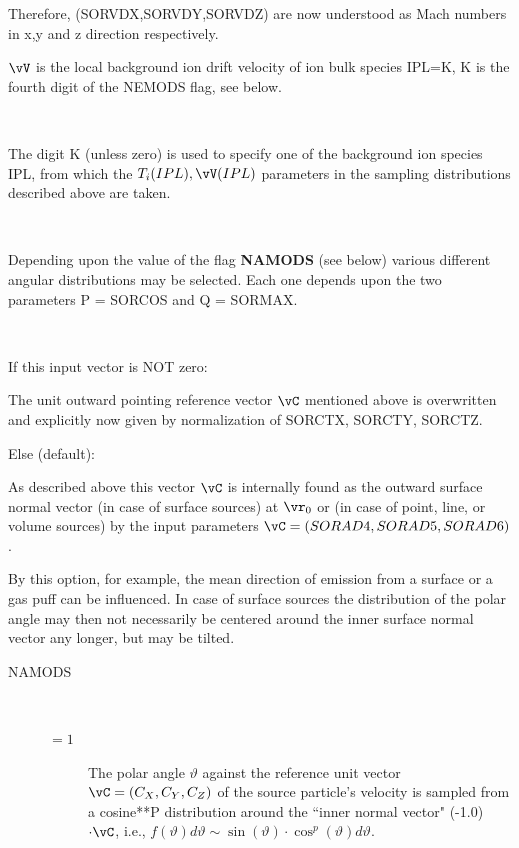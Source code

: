 \begin{description}
\begin{description}
                Therefore, {(SORVDX,SORVDY,SORVDZ)} are now understood as Mach numbers in x,y
                and z direction respectively.
          \item[L = 3] $\vV$ is the local background ion drift velocity of ion bulk
                species IPL=K, K is the fourth digit of the NEMODS flag, see below.

          \item[K options] ~ 

                The digit K (unless zero) is used to specify one of the background ion species
                IPL, from which the $T_i(IPL), \vV(IPL) $ parameters in the sampling
                distributions described above are taken.

        \end{description}
  \item[SORCOS, SORMAX]~ 

        Depending upon the value of the flag \textbf{NAMODS} (see below) various
        different angular distributions may be selected.
        Each one depends upon the two parameters P = SORCOS and Q = SORMAX.
  \item[SORCTX, SORCTY, SORCTZ]~ 

        If this input vector is NOT zero:

        The unit outward pointing reference vector $\vC $ mentioned above is
        overwritten and explicitly now given by normalization of SORCTX, SORCTY,
        SORCTZ.

        Else (default):

        As described above this vector $\vC$ is internally found as the outward surface
        normal vector (in case of surface sources) at $\vr_0$ or (in case of point,
        line, or volume sources) by the input parameters $\vC =(SORAD4,SORAD5,SORAD6)$.

        By this option, for example, the mean direction of emission from a surface or a
        gas puff can be influenced.
        In case of surface sources the distribution of the polar angle may then not
        necessarily be centered around the inner surface normal vector any longer, but
        may be tilted.

        \begin{description}
          \item[NAMODS] ~ 

                \begin{description}
                  \item[$= 1$] The polar angle $\vartheta$ against the
                        reference unit vector $\vC = (C_X,C_Y,C_Z)$ of the source particle's velocity
                        is sampled from a cosine**P distribution around the ``inner normal vector"
                        (-1.0) $\cdot \vC $, i.e., $f( \vartheta )   d \vartheta   \sim \sin( \vartheta
                          )  \cdot  \cos^p ( \vartheta )	       d \vartheta$.


\end{description}
\end{description}
\end{description}
